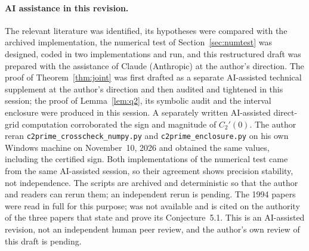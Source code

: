 \documentclass[11pt]{article}
\theoremstyle{remark}
\begin{document}
\paragraph{AI assistance in this revision.}
The relevant literature was identified, its hypotheses were compared with the archived
implementation, the numerical test of Section~\ref{sec:numtest} was designed, coded in two implementations and run, and this
restructured draft was prepared with the assistance of Claude (Anthropic) at the author's
direction. The proof of Theorem~\ref{thm:joint} was first drafted as a separate AI-assisted technical
supplement at the author's direction and then audited and tightened in this session; the
proof of Lemma~\ref{lem:q2}, its symbolic audit and the interval enclosure were produced in
this session. A separately written AI-assisted direct-grid computation corroborated the sign
and magnitude of $C_2'(0)$. The author reran \texttt{c2prime\_crosscheck\_numpy.py} and
\texttt{c2prime\_enclosure.py} on his own Windows machine on November~10, 2026 and obtained the
same values, including the certified sign. Both implementations of the numerical test came from the same AI-assisted session, so their agreement shows
precision stability, not independence. The scripts are archived and deterministic so that the
author and readers can rerun them; an independent rerun is pending. The 1994 papers
\cite{georgtausch,verlindencools,lyness94} were read in full for this purpose;
\cite{georg91} was not available and is cited on the authority of the three papers that state
and prove its Conjecture~5.1. This is an AI-assisted revision, not an independent human peer
review, and the author's own review of this draft is pending.
\end{document}
